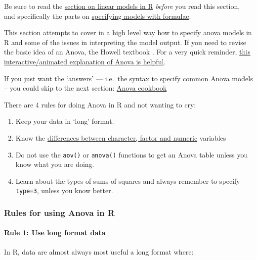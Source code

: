 \documentclass[]{article}
\providecommand{\tightlist}{%
  \setlength{\itemsep}{0pt}\setlength{\parskip}{0pt}}
\let\oldparagraph\paragraph
\renewcommand{\paragraph}[1]{\oldparagraph{#1}\mbox{}}
\begin{document}
{Be sure to read the \protect\hyperlink{linear-models-simple}{section on linear models in R}
\emph{before} you read this section, and specifically the parts on
\protect\hyperlink{formulae}{specifying models with formulae}.}

This section attempts to cover in a high level way how to specify anova models
in R and some of the issues in interpreting the model output. If you need to
revise the basic idea of an Anova, the Howell textbook \citep{howell2016fundamental}.
For a very quick reminder,
\href{http://web.utah.edu/stat/introstats/anovaflash.html}{this interactive/animated explanation of Anova is helpful}.

If you just want the `answers' --- i.e.~the syntax to specify common Anova models
-- you could skip to the next section: \protect\hyperlink{anova-cookbook}{Anova cookbook}

There are 4 rules for doing Anova in R and not wanting to cry:

\begin{enumerate}
\def\labelenumi{\arabic{enumi}.}
\tightlist
\item
  Keep your data in `long' format.
\item
  Know the
  \protect\hyperlink{factors-and-numerics}{differences between character, factor and numeric}
  variables
\item
  Do not use the \texttt{aov()} or \texttt{anova()} functions to get an Anova table unless
  you know what you are doing.
\item
  Learn about the types of sums of squares and always remember to specify
  \texttt{type=3}, unless you know better.
\end{enumerate}

\hypertarget{rules-for-using-anova-in-r}{%
\subsubsection*{Rules for using Anova in R}\label{rules-for-using-anova-in-r}}

\hypertarget{rule-1-use-long-format-data}{%
\paragraph{Rule 1: Use long format data}\label{rule-1-use-long-format-data}}

In R, data are almost always most useful a long format where:
\end{document}

